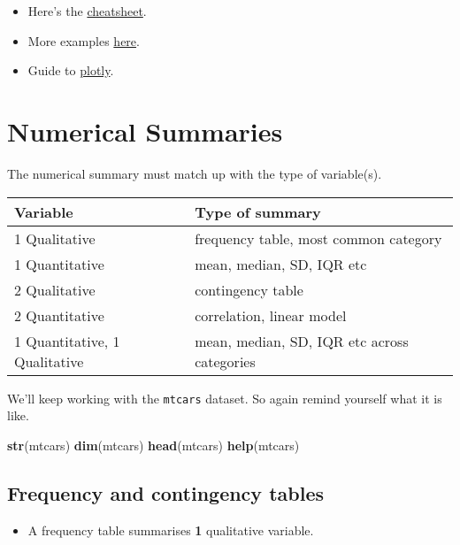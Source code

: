 \documentclass[]{article}
\newenvironment{Shaded}{\begin{snugshade}}{\end{snugshade}}
\newcommand{\KeywordTok}[1]{\textcolor[rgb]{0.13,0.29,0.53}{\textbf{#1}}}
\newcommand{\NormalTok}[1]{#1}
\providecommand{\tightlist}{%
  \setlength{\itemsep}{0pt}\setlength{\parskip}{0pt}}
\begin{document}
\begin{itemize}
\tightlist
\item
  Here's the \href{xhttps://images.plot.ly/plotly-documentation/images/r_cheat_sheet.pdf?_ga=2.230192159.2094081876.1551756856-1656530949.1551756856}{cheatsheet}.
\item
  More examples \href{https://www.r-graph-gallery.com/121-manage-colors-with-plotly/}{here}.
\item
  Guide to \href{https://plotly-book.cpsievert.me/}{plotly}.
\end{itemize}

\hypertarget{numericalsummaries}{%
\section{Numerical Summaries}\label{numericalsummaries}}

The numerical summary must match up with the type of variable(s).

\begin{longtable}[]{@{}ll@{}}
\toprule
Variable & Type of summary\tabularnewline
\midrule
\endhead
1 Qualitative & frequency table, most common category\tabularnewline
1 Quantitative & mean, median, SD, IQR etc\tabularnewline
2 Qualitative & contingency table\tabularnewline
2 Quantitative & correlation, linear model\tabularnewline
1 Quantitative, 1 Qualitative & mean, median, SD, IQR etc across categories\tabularnewline
\bottomrule
\end{longtable}

We'll keep working with the \texttt{mtcars} dataset.
So again remind yourself what it is like.

\begin{Shaded}
\begin{Highlighting}[]
\KeywordTok{str}\NormalTok{(mtcars)}
\KeywordTok{dim}\NormalTok{(mtcars)}
\KeywordTok{head}\NormalTok{(mtcars)}
\KeywordTok{help}\NormalTok{(mtcars)}
\end{Highlighting}
\end{Shaded}

\hypertarget{frequency-and-contingency-tables}{%
\subsection{Frequency and contingency tables}\label{frequency-and-contingency-tables}}

\begin{itemize}
\tightlist
\item
  A frequency table summarises \textbf{1} qualitative variable.
\end{itemize}
\end{document}

